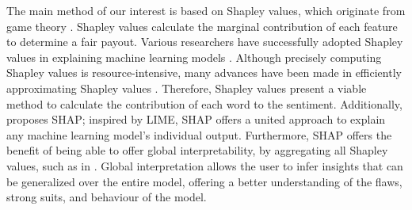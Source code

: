 The main method of our interest is based on Shapley values, which originate from game theory \cite{Shapley}. Shapley values calculate the marginal contribution of each feature to determine a fair payout. Various researchers have successfully adopted Shapley values in explaining machine learning models \cite{Cohen,Ghorbani,Lundberg}. Although precisely computing Shapley values is resource-intensive, many advances have been made in efficiently approximating Shapley values \cite{Aas,Ancona,Chen}. Therefore, Shapley values present a viable method to calculate the contribution of each word to the sentiment. Additionally, \cite{Lundberg} proposes SHAP; inspired by LIME, SHAP offers a united approach to explain any machine learning model's individual output. Furthermore, SHAP offers the benefit of being able to offer global interpretability, by aggregating all Shapley values, such as in \cite{Feng,Lundberg2}. Global interpretation allows the user to infer insights that can be generalized over the entire model, offering a better understanding of the flaws, strong suits, and behaviour of the model.